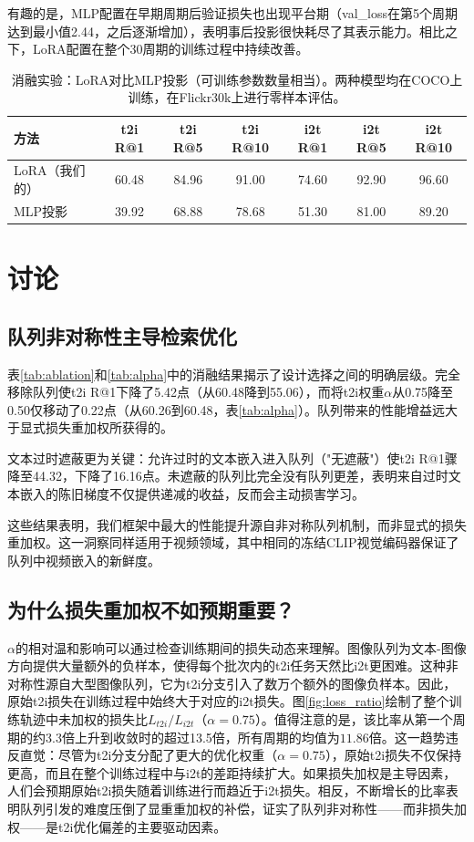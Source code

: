 \documentclass[10pt,a4paper]{ctexart}
\begin{document}
有趣的是，MLP配置在早期周期后验证损失也出现平台期（val\_loss在第5个周期达到最小值2.44，之后逐渐增加），表明事后投影很快耗尽了其表示能力。相比之下，LoRA配置在整个30周期的训练过程中持续改善。

\begin{table}[h]
\centering
\caption{消融实验：LoRA对比MLP投影（可训练参数数量相当）。两种模型均在COCO上训练，在Flickr30k上进行零样本评估。}
\label{tab:ablation_mlp}
\begin{tabular}{lcccccc}
\toprule
方法 & t2i R@1 & t2i R@5 & t2i R@10 & i2t R@1 & i2t R@5 & i2t R@10 \\
\midrule
LoRA（我们的） & 60.48 & 84.96 & 91.00 & 74.60 & 92.90 & 96.60 \\
MLP投影 & 39.92 & 68.88 & 78.68 & 51.30 & 81.00 & 89.20 \\
\bottomrule
\end{tabular}
\end{table}

\section{讨论}

\subsection{队列非对称性主导检索优化}

表\ref{tab:ablation}和\ref{tab:alpha}中的消融结果揭示了设计选择之间的明确层级。完全移除队列使t2i R@1下降了5.42点（从60.48降到55.06），而将t2i权重$\alpha$从0.75降至0.50仅移动了0.22点（从60.26到60.48，表\ref{tab:alpha}）。队列带来的性能增益远大于显式损失重加权所获得的。

文本过时遮蔽更为关键：允许过时的文本嵌入进入队列（"无遮蔽"）使t2i R@1骤降至44.32，下降了16.16点。未遮蔽的队列比完全没有队列更差，表明来自过时文本嵌入的陈旧梯度不仅提供递减的收益，反而会主动损害学习。

这些结果表明，我们框架中最大的性能提升源自非对称队列机制，而非显式的损失重加权。这一洞察同样适用于视频领域，其中相同的冻结CLIP视觉编码器保证了队列中视频嵌入的新鲜度。

\subsection{为什么损失重加权不如预期重要？}

$\alpha$的相对温和影响可以通过检查训练期间的损失动态来理解。图像队列为文本-图像方向提供大量额外的负样本，使得每个批次内的t2i任务天然比i2t更困难。这种非对称性源自大型图像队列，它为t2i分支引入了数万个额外的图像负样本。因此，原始t2i损失在训练过程中始终大于对应的i2t损失。图\ref{fig:loss_ratio}绘制了整个训练轨迹中未加权的损失比$L_{t2i}/L_{i2t}$（$\alpha{=}0.75$）。值得注意的是，该比率从第一个周期的约3.3倍上升到收敛时的超过13.5倍，所有周期的均值为$11.86$倍。这一趋势违反直觉：尽管为t2i分支分配了更大的优化权重（$\alpha{=}0.75$），原始t2i损失不仅保持更高，而且在整个训练过程中与i2t的差距持续扩大。如果损失加权是主导因素，人们会预期原始t2i损失随着训练进行而趋近于i2t损失。相反，不断增长的比率表明队列引发的难度压倒了显重重加权的补偿，证实了队列非对称性——而非损失加权——是t2i优化偏差的主要驱动因素。
\end{document}
